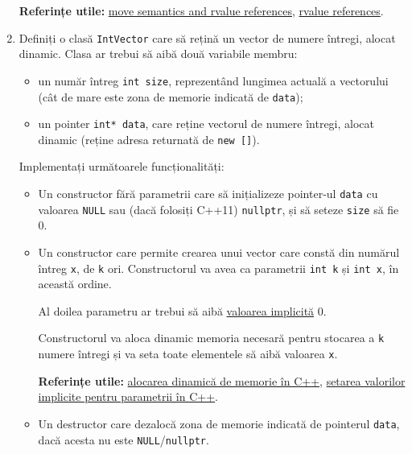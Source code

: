 \begin{enumerate}
    \textbf{Referințe utile:} \href{https://itnext.io/move-semantics-and-rvalue-references-modern-c-fundamentals-cbbe38760c05}{move semantics and rvalue references}, \href{https://www.open-std.org/jtc1/sc22/wg21/docs/papers/2006/n2027.html}{rvalue references}.

    \item Definiți o clasă \texttt{IntVector} care să rețină un vector de numere întregi, alocat dinamic. Clasa ar trebui să aibă două variabile membru:
    \begin{itemize}
        \item un număr întreg \texttt{int size}, reprezentând lungimea actuală a vectorului (cât de mare este zona de memorie indicată de \texttt{data});
        \item un pointer \texttt{int* data}, care reține vectorul de numere întregi, alocat dinamic (reține adresa returnată de \texttt{new []}).
    \end{itemize}

    Implementați următoarele funcționalități:
    \begin{itemize}
        \item Un constructor fără parametrii care să inițializeze pointer-ul \texttt{data} cu valoarea \texttt{NULL} sau (dacă folosiți C++11) \texttt{nullptr}, și să seteze \texttt{size} să fie 0.

        \item Un constructor care permite crearea unui vector care constă din numărul întreg \texttt{x}, de \texttt{k} ori. Constructorul va avea ca parametrii \texttt{int k} și \texttt{int x}, în această ordine.
        
        Al doilea parametru ar trebui să aibă \href{https://en.cppreference.com/w/cpp/language/default_arguments}{valoarea implicită} 0.

        Constructorul va aloca dinamic memoria necesară pentru stocarea a \texttt{k} numere întregi și va seta toate elementele să aibă valoarea \texttt{x}.

        \textbf{Referințe utile:} \href{https://cplusplus.com/doc/tutorial/dynamic/}{alocarea dinamică de memorie în C++}, \href{https://www.geeksforgeeks.org/default-arguments-c/}{setarea valorilor implicite pentru parametrii în C++}.

        \item Un destructor care dezalocă zona de memorie indicată de pointerul \texttt{data}, dacă acesta nu este \texttt{NULL}/\texttt{nullptr}.
        

\end{itemize}
\end{enumerate}
